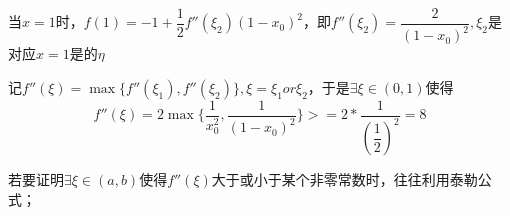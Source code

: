 当\(x = 1\)时，\(f(1) = -1 + \dfrac{1}{2}f''(\xi_2)(1 - x_0)^2\)，即\(f''(\xi_2) = \dfrac{2}{(1 - x_0)^2}, \xi_2\)是对应\(x = 1\)是的\(\eta\)

记\(f''(\xi) = \max\{f''(\xi_1), f''(\xi_2)\}, \xi = \xi_1 or \xi_2\)，于是\(\exists \xi \in (0, 1)\)使得\[f''(\xi) = 2\max\{\dfrac{1}{x_0^2}, \dfrac{1}{(1 - x_0)^2}\} >= 2 * \dfrac{1}{(\dfrac{1}{2})^2} = 8\]

若要证明\(\exists \xi \in (a, b)\)使得\(f''(\xi)\)大于或小于某个非零常数时，往往利用泰勒公式；












